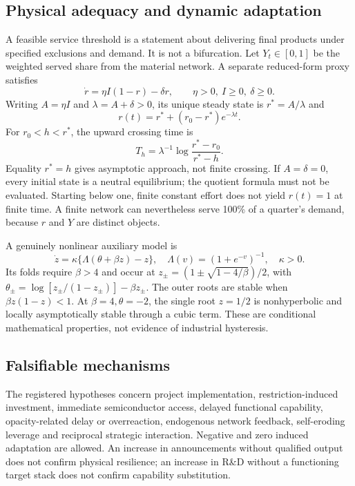 \documentclass[11pt]{article}
\begin{document}
\subsection{Physical adequacy and dynamic adaptation}
A feasible service threshold is a statement about delivering final products under specified exclusions and demand. It is not a bifurcation. Let $Y_t\in[0,1]$ be the weighted served share from the material network. A separate reduced-form proxy satisfies
\begin{equation}
 \dot r=\eta I(1-r)-\delta r,\qquad \eta>0,\ I\geq0,\ \delta\geq0.
\end{equation}
Writing $A=\eta I$ and $\lambda=A+\delta>0$, its unique steady state is $r^*=A/\lambda$ and
\begin{equation}
 r(t)=r^*+(r_0-r^*)e^{-\lambda t}.
\end{equation}
For $r_0<h<r^*$, the upward crossing time is
\begin{equation}
 T_h=\lambda^{-1}\log\frac{r^*-r_0}{r^*-h}.
\end{equation}
Equality $r^*=h$ gives asymptotic approach, not finite crossing. If $A=\delta=0$, every initial state is a neutral equilibrium; the quotient formula must not be evaluated. Starting below one, finite constant effort does not yield $r(t)=1$ at finite time. A finite network can nevertheless serve 100\% of a quarter's demand, because $r$ and $Y$ are distinct objects.

A genuinely nonlinear auxiliary model is
\begin{equation}
 \dot z=\kappa\{\Lambda(\theta+\beta z)-z\},\quad
 \Lambda(v)=(1+e^{-v})^{-1},\quad \kappa>0.
\end{equation}
Its folds require $\beta>4$ and occur at $z_\pm=(1\pm\sqrt{1-4/\beta})/2$, with $\theta_\pm=\log[z_\pm/(1-z_\pm)]-\beta z_\pm$. The outer roots are stable when $\beta z(1-z)<1$. At $\beta=4,\theta=-2$, the single root $z=1/2$ is nonhyperbolic and locally asymptotically stable through a cubic term. These are conditional mathematical properties, not evidence of industrial hysteresis.

\subsection{Falsifiable mechanisms}
The registered hypotheses concern project implementation, restriction-induced investment, immediate semiconductor access, delayed functional capability, opacity-related delay or overreaction, endogenous network feedback, self-eroding leverage and reciprocal strategic interaction. Negative and zero induced adaptation are allowed. An increase in announcements without qualified output does not confirm physical resilience; an increase in R\&D without a functioning target stack does not confirm capability substitution.
\end{document}
